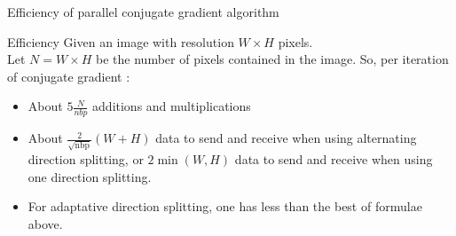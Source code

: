 \documentclass[compress,10pt,aspectratio=169]{beamer}
\begin{document}
\begin{frame}[fragile]{Efficiency of parallel conjugate gradient algorithm}
  \scriptsize
  \begin{block}{Efficiency}
    Given an image with resolution $W\times H$ pixels.\\
    Let $N = W \times H$ be the number of pixels contained in the image. So, per iteration of conjugate gradient :
    \begin{itemize}
    \item About $5\frac{N}{nbp}$ additions and multiplications
    \item About $\displaystyle \frac{2}{\sqrt{\mbox{nbp}}}\left(W + H\right)$ data to send and receive when using alternating
          direction splitting, or $2\min\left(W,H\right)$ data to send and receive when using one direction splitting.
    \item For adaptative direction splitting, one has less than the best of formulae above.
    \end{itemize}
  \end{block}
\end{frame}
\end{document}
